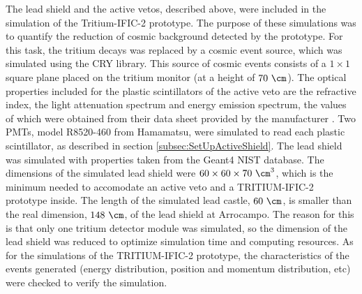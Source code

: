 The lead shield and the active vetos, described above, were included in the simulation of the Tritium-IFIC-2 prototype. The purpose of these simulations was to quantify the reduction of cosmic background detected by the prototype. For this task, the tritium decays was replaced by a cosmic event source, which was simulated using the CRY library. This source of cosmic events consists of a $1 \times 1$ square plane placed on the tritium monitor (at a height of $70~\cm$). The optical properties included for the plastic scintillators of the active veto are the refractive index, the light attenuation spectrum and energy emission spectrum, the values of which were obtained from their data sheet provided by the manufacturer \cite{ScintillatorVeto}. Two PMTs, model R8520-460 from Hamamatsu, were simulated to read each plastic scintillator, as described in section \ref{subsec:SetUpActiveShield}. The lead shield was simulated with properties taken from the Geant4 NIST database. The dimensions of the simulated lead shield were $60 \times 60 \times 70~\cm^3$, which is the minimum needed to accomodate an active veto and a TRITIUM-IFIC-2 prototype inside. The length of the simulated lead castle, $60~\cm$, is smaller than the real dimension, $148~\cm$, of the lead shield at Arrocampo. The reason for this is that only one tritium detector module was simulated, so the dimension of the lead shield was reduced to optimize simulation time and computing resources. As for the simulations of the TRITIUM-IFIC-2 prototype, the characteristics of the events generated (energy distribution, position and momentum distribution, etc) were checked to verify the simulation.

